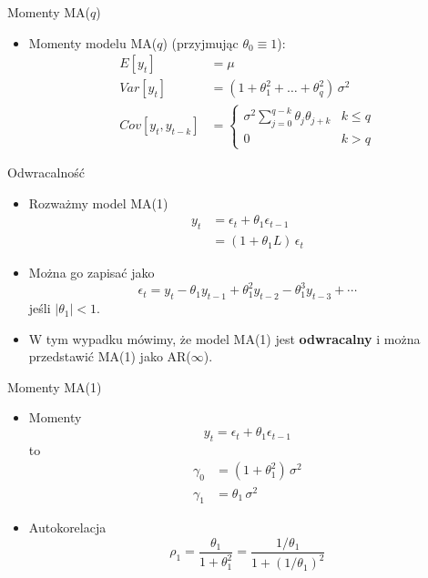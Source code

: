 \documentclass[11pt,usenames,dvipsnames,aspectratio=169]{beamer}
\begin{document}
\begin{frame}{Momenty MA($q$)}
\begin{itemize}
    \item Momenty modelu MA($q$) (przyjmując $\theta_{0}\equiv 1$):
    \begin{align*}
    E[y_{t}] & =\mu\\
    Var[y_{t}] & =(1+\theta_{1}^{2}+\ldots+\theta_{q}^{2})\,\sigma^{2}\\
    Cov[y_{t},y_{t-k}] & =\begin{cases}
    \sigma^{2}\sum_{j=0}^{q-k}\theta_{j}\theta_{j+k} & k\leq q\\
    0 & k>q
    \end{cases}
    \end{align*}
\end{itemize}
\end{frame}

\begin{frame}{Odwracalność}
\begin{itemize}
    \item Rozważmy model MA(1)
    \begin{align*}
    y_{t} & =\epsilon_{t}+\theta_{1}\epsilon_{t-1}\\
         & =(1+\theta_{1}L)\,\epsilon_{t}
    \end{align*}
    \item Można go zapisać jako
    \[
    \epsilon_{t}=y_{t}-\theta_{1}y_{t-1}+\theta_{1}^{2}y_{t-2}-\theta_{1}^{3}y_{t-3}+\cdots
    \]
    jeśli $|\theta_{1}|<1$.
    \item W tym wypadku mówimy, że model MA(1) jest \textbf{odwracalny} i można przedstawić MA(1) jako AR($\infty$).
\end{itemize}
\end{frame}

\begin{frame}{Momenty MA(1)}
\begin{itemize}
    \item Momenty
    \[
    y_{t}=\epsilon_{t}+\theta_{1}\epsilon_{t-1}
    \]
    to
    \begin{align*}
    \gamma_{0} & =(1+\theta_{1}^{2})\,\sigma^{2}\\
    \gamma_{1} & =\theta_{1}\,\sigma^{2}
    \end{align*}
    \item Autokorelacja
    \[
    \rho_{1}=\frac{\theta_{1}}{1+\theta_{1}^{2}}=\frac{1/\theta_{1}}{1+(1/\theta_{1})^{2}}
    \]
\end{itemize}
\end{frame}
\end{document}
